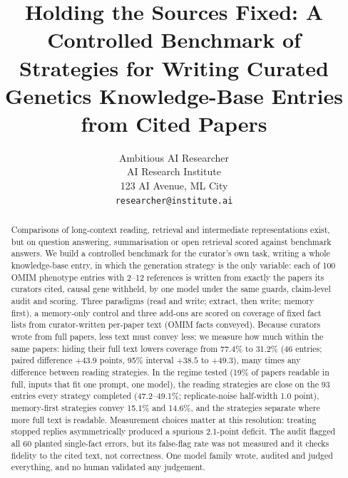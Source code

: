 \documentclass{article} %
\title{Holding the Sources Fixed: A Controlled Benchmark of Strategies for Writing Curated Genetics Knowledge-Base Entries from Cited Papers}
\author{Ambitious AI Researcher\\
AI Research Institute\\
123 AI Avenue, ML City\\
\texttt{researcher@institute.ai}
}
\begin{document}
\maketitle


\begin{abstract}
Comparisons of long-context reading, retrieval and intermediate representations exist, but on question answering, summarisation or open retrieval scored against benchmark answers. We build a controlled benchmark for the curator's own task, writing a whole knowledge-base entry, in which the generation strategy is the only variable: each of 100 OMIM phenotype entries with 2--12 references is written from exactly the papers its curators cited, causal gene withheld, by one model under the same guards, claim-level audit and scoring. Three paradigms (read and write; extract, then write; memory first), a memory-only control and three add-ons are scored on coverage of fixed fact lists from curator-written per-paper text (OMIM facts conveyed). Because curators wrote from full papers, less text must convey less; we measure how much within the same papers: hiding their full text lowers coverage from 77.4\% to 31.2\% (46 entries; paired difference $+43.9$ points, 95\% interval $+38.5$ to $+49.3$), many times any difference between reading strategies. In the regime tested (19\% of papers readable in full, inputs that fit one prompt, one model), the reading strategies are close on the 93 entries every strategy completed (47.2--49.1\%; replicate-noise half-width 1.0 point), memory-first strategies convey 15.1\% and 14.6\%, and the strategies separate where more full text is readable. Measurement choices matter at this resolution: treating stopped replies asymmetrically produced a spurious 2.1-point deficit. The audit flagged all 60 planted single-fact errors, but its false-flag rate was not measured and it checks fidelity to the cited text, not correctness. One model family wrote, audited and judged everything, and no human validated any judgement.
\end{abstract}
\end{document}
